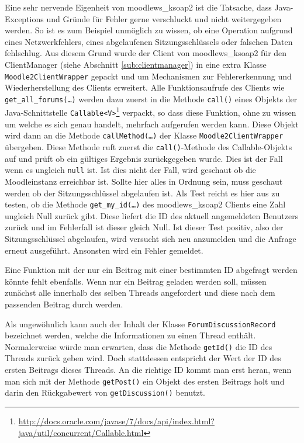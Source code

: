 Eine sehr nervende Eigenheit von moodlews\_ksoap2 ist die Tatsache, dass Java-Exceptions und Gründe für Fehler gerne verschluckt und nicht weitergegeben werden. So ist es zum Beispiel unmöglich zu wissen, ob eine Operation aufgrund eines Netzwerkfehlers, eines abgelaufenen Sitzungsschlüssels oder falschen Daten fehlschlug. Aus diesem Grund wurde der Client von moodlews\_ksoap2 für den ClientManager (siehe Abschnitt \ref{sub:clientmanager}) in eine extra Klasse \texttt{Moodle2ClientWrapper} gepackt und um Mechanismen zur Fehlererkennung und Wiederherstellung des Clients erweitert. Alle Funktionsaufrufe des Clients wie \texttt{get\_all\_forums(\dots)} werden dazu zuerst in die Methode \texttt{call()} eines Objekts der Java-Schnittstelle \texttt{Callable<V>}\footnote{\url{http://docs.oracle.com/javase/7/docs/api/index.html?java/util/concurrent/Callable.html}} verpackt, so dass diese Funktion, ohne zu wissen um welche es sich genau handelt, mehrfach aufgerufen werden kann. Diese Objekt wird dann an die Methode \texttt{callMethod(\dots)} der Klasse \texttt{Moodle2ClientWrapper} übergeben. Diese Methode ruft zuerst die \texttt{call()}-Methode des Callable-Objekts auf und prüft ob ein gültiges Ergebnis zurückgegeben wurde. Dies ist der Fall wenn es ungleich \texttt{null} ist. Ist dies nicht der Fall, wird geschaut ob die Moodleinstanz erreichbar ist. Sollte hier alles in Ordnung sein, muss geschaut werden ob der Sitzungsschlüssel abgelaufen ist. Als Test reicht es hier aus zu testen, ob die Methode \texttt{get\_my\_id(\dots)} des moodlews\_ksoap2 Clients eine Zahl ungleich Null zurück gibt. Diese liefert die ID des aktuell angemeldeten Benutzers zurück und im Fehlerfall ist dieser gleich Null. Ist dieser Test positiv, also der Sitzungsschlüssel abgelaufen, wird versucht sich neu anzumelden und die Anfrage erneut ausgeführt. Ansonsten wird ein Fehler gemeldet.

Eine Funktion mit der nur ein Beitrag mit einer bestimmten ID abgefragt werden könnte fehlt ebenfalls. Wenn nur ein Beitrag geladen werden soll, müssen zunächst alle innerhalb des selben Threads angefordert und diese nach dem passenden Beitrag durch werden. 

Als ungewöhnlich kann auch der Inhalt der Klasse \texttt{ForumDiscussionRecord} bezeichnet werden, welche die Informationen zu einen Thread enthält. Normalerweise würde man erwarten, dass die Methode \texttt{getId()} die ID des Threads zurück geben wird. Doch stattdessen entspricht der Wert der ID des ersten Beitrags dieses Threads. An die richtige ID kommt man erst heran, wenn man sich mit der Methode \texttt{getPost()} ein Objekt des ersten Beitrags holt und darin den Rückgabewert von \texttt{getDiscussion()} benutzt.

